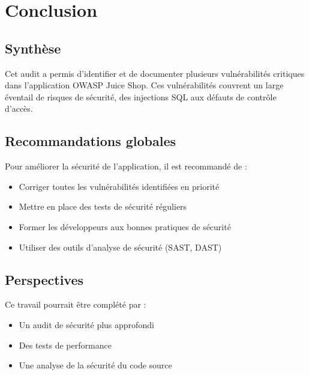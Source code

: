 
\chapter{Conclusion}

\section{Synthèse}
Cet audit a permis d'identifier et de documenter plusieurs vulnérabilités critiques dans l'application OWASP Juice Shop. Ces vulnérabilités couvrent un large éventail de risques de sécurité, des injections SQL aux défauts de contrôle d'accès.

\section{Recommandations globales}
Pour améliorer la sécurité de l'application, il est recommandé de :
\begin{itemize}
    \item Corriger toutes les vulnérabilités identifiées en priorité
    \item Mettre en place des tests de sécurité réguliers
    \item Former les développeurs aux bonnes pratiques de sécurité
    \item Utiliser des outils d'analyse de sécurité (SAST, DAST)
\end{itemize}

\section{Perspectives}
Ce travail pourrait être complété par :
\begin{itemize}
    \item Un audit de sécurité plus approfondi
    \item Des tests de performance
    \item Une analyse de la sécurité du code source
\end{itemize}

